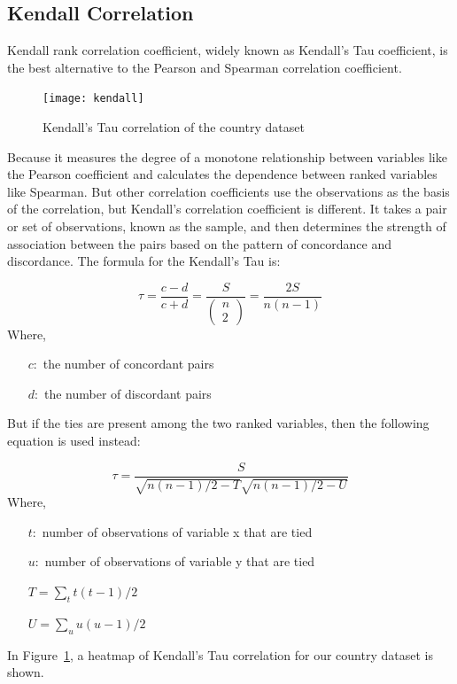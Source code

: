 \documentclass{swfuthesise}
\begin{document}
\subsection{Kendall Correlation}

Kendall rank correlation coefficient, widely known as Kendall’s Tau coefficient, is the best alternative to the Pearson and Spearman correlation coefficient.

\begin{figure}[!htp]
  \centering \texttt{[image: kendall]}
  \caption{Kendall's Tau correlation of the country dataset\label{fig:kendall}}  
\end{figure}
  
Because it measures the degree of a monotone relationship between variables like the Pearson coefficient and calculates the dependence between ranked variables like Spearman. But other correlation coefficients use the observations as the basis of the correlation, but Kendall’s correlation coefficient is different. It takes a pair or set of observations, known as the sample, and then determines the strength of association between the pairs based on the pattern of concordance and discordance. The formula for the Kendall's Tau is:

\[
  \tau = \frac{c-d}{c+d} = \frac{S}{
	\left(
      \begin{matrix}
        n \\
        2
      \end{matrix}
    \right)}
  = \frac{2S}{n(n-1)}    
\]
Where,
\begin{itemize}[itemsep=-1.5ex]
\item[\(c:\)] the number of concordant pairs
\item[\(d:\)] the number of discordant pairs
\end{itemize}

But if the ties are present among the two ranked variables, then the following equation is used instead:

\[
  \tau = \frac{S}{\sqrt{n(n-1)/2-T}\sqrt{n(n-1)/2-U}}
\]
Where,
\begin{itemize}[itemsep=-1.5ex]
\item[\(t:\)] number of observations of variable x that are tied
\item[\(u:\)] number of observations of variable y that are tied
\item[] \(T = \sum_t t(t-1)/2\)
\item[] \(U = \sum_u u(u-1)/2\)
\end{itemize} 
In Figure~\ref{fig:kendall}, a heatmap of Kendall's Tau correlation for our country dataset is shown.
\end{document}
